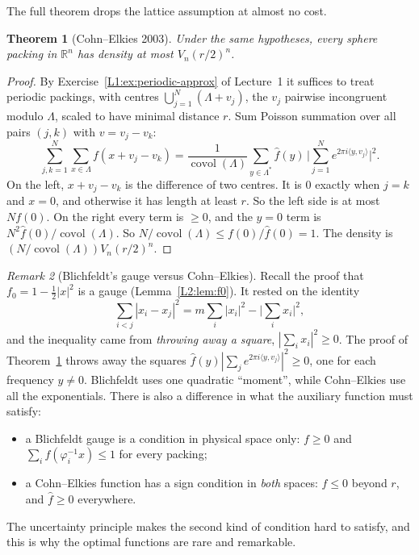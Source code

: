 \documentclass[11pt,openany]{book}
\theoremstyle{plain}
\newtheorem{theorem}{Theorem}[chapter]
\theoremstyle{definition}
\theoremstyle{remark}
\newtheorem{remark}[theorem]{Remark}
\newcommand{\R}{\mathbb{R}}
\newcommand{\Lat}{\Lambda}             %
\newcommand{\covol}{\operatorname{covol}}
\newcommand{\abs}[1]{\left\lvert #1 \right\rvert}
\newcommand{\ip}[2]{\langle #1, #2\rangle}
\begin{document}
The full theorem drops the lattice assumption at almost no cost.

\begin{theorem}[Cohn--Elkies 2003]\label{NT:thm:CE}
Under the same hypotheses, every sphere packing in $\R^n$ has density at most $V_n(r/2)^n$.
\end{theorem}

\begin{proof}
By Exercise~\ref{L1:ex:periodic-approx} of Lecture~1 it suffices to treat periodic packings, with
centres $\bigcup_{j=1}^N(\Lat+v_j)$, the $v_j$ pairwise incongruent modulo $\Lat$, scaled to have
minimal distance $r$. Sum Poisson summation over all pairs
$(j,k)$ with $v=v_j-v_k$:
\[
  \sum_{j,k=1}^N\sum_{x\in\Lat}f(x+v_j-v_k)
  =\frac{1}{\covol(\Lat)}\sum_{y\in\Lat^*}\hat f(y)\,\Big|\sum_{j=1}^Ne^{2\pi i\ip y{v_j}}\Big|^2 .
\]
On the left, $x+v_j-v_k$ is the difference of two centres. It is $0$ exactly when $j=k$ and $x=0$, and
otherwise it has length at least $r$. So the left side is at most $Nf(0)$. On the right every term is
$\ge0$, and the $y=0$ term is $N^2\hat f(0)/\covol(\Lat)$. So $N/\covol(\Lat)\le f(0)/\hat f(0)=1$. The
density is $(N/\covol(\Lat))V_n(r/2)^n$.
\end{proof}

\begin{remark}[Blichfeldt's gauge versus Cohn--Elkies]\label{NT:rem:blichfeldt-vs-CE}
Recall the proof that $f_0=1-\frac12\abs x^2$ is a gauge (Lemma~\ref{L2:lem:f0}). It rested on the identity
\[
  \sum_{i<j}\abs{x_i-x_j}^2=m\sum_i\abs{x_i}^2-\Big|\sum_ix_i\Big|^2,
\]
and the inequality came from \emph{throwing away a square}, $\abs{\sum_ix_i}^2\ge0$. The proof of
Theorem~\ref{NT:thm:CE} throws away the squares $\hat f(y)\abs{\sum_je^{2\pi i\ip y{v_j}}}^2\ge0$, one for
each frequency $y\ne0$. Blichfeldt uses one quadratic ``moment'', while Cohn--Elkies use all the
exponentials. There is also a difference in what the auxiliary function must satisfy:
\begin{itemize}[nosep]
\item a Blichfeldt gauge is a condition in physical space only: $f\ge0$ and
  $\sum_if(\varphi_i^{-1}x)\le1$ for every packing;
\item a Cohn--Elkies function has a sign condition in \emph{both} spaces: $f\le0$ beyond $r$, and
  $\hat f\ge0$ everywhere.
\end{itemize}
The uncertainty principle makes the second kind of condition hard to satisfy, and this is why the
optimal functions are rare and remarkable.
\end{remark}
\end{document}
